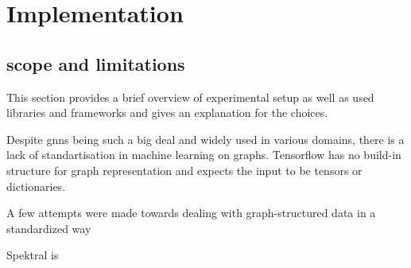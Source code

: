 \chapter{Implementation}
\label{sec:implement}

\section{scope and limitations}
\label{sec:implement:sec1}

This section provides a brief overview of experimental setup as well as used libraries
and frameworks and gives an explanation for the choices.


Despite \acp{gnn} being such a big deal and widely used in various domains, there
is a lack of standartisation in machine learning on graphs. Tensorflow has no build-in structure for
graph representation and expects the input to be tensors or dictionaries.


A few attempts were made towards dealing with graph-structured data in a standardized way


Spektral is




